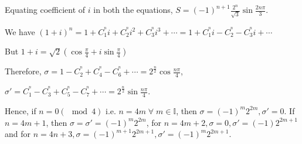   Equating coefficient of $i$ in both the equations, $S = (-1)^{n +
    1}\frac{2^n}{\sqrt{3}}\sin\frac{2n\pi}{3}$.
\item We have $(1 + i)^n = 1 + C_1^^n i + C_2^^n i^2 + C_3^^n i^3 + \cdots = 1 + C_1^^n i - C_2^^n - C_3^^n
  i + \cdots$

  But $1 + i = \sqrt{2}\left(\cos\frac{\pi}{4} + i\sin\frac{\pi}{4}\right)$

  Therefore, $\sigma = 1 - C_2^^n + C_4^^n -C_6^^n + \cdots = 2^{\frac{n}{2}}\cos\frac{n\pi}{4}$,

  $\sigma' = C_1^^n - C_3^^n + C_5^^n - C_7^^n + \cdots = 2^{\frac{n}{2}}\sin\frac{n\pi}{4}$.

  Hence, if $n = 0(\mod 4)$ i.e. $n = 4m\;\forall\;m\in\mathbb{I}$, then $\sigma = (-1)^m2^{2m}, \sigma' =
  0$. If $n = 4m + 1$, then $\sigma = \sigma' = (-1)^m2^{2m}$, for $n = 4m + 2, \sigma = 0, \sigma' =
  (-1)2^{2m + 1}$ and for $n = 4n + 3, \sigma = (-1)^{m + 1}2^{2m + 1}, \sigma' = (-1)^m2^{2m + 1}$.

\stopitemize
